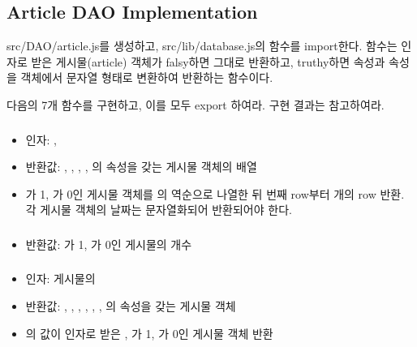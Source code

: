 \subsection*{Article DAO Implementation}

src/DAO/article.js를 생성하고, src/lib/database.js의  함수를 import한다.  함수는 인자로 받은 게시물(article) 객체가 falsy하면 그대로 반환하고, truthy하면  속성과  속성을  객체에서 문자열 형태로 변환하여 반환하는 함수이다.

다음의 7개 함수를 구현하고, 이를 모두 export 하여라. 구현 결과는 \를 참고하여라.

\subsubsection*{}
\begin{itemize}
    \item 인자: , 
    \item 반환값: , , , , 의  속성을 갖는 게시물 객체의 배열
    \item {}가 1, 가 0인 게시물 객체를 의 역순으로 나열한 뒤 번째 row부터 개의 row 반환. 각 게시물 객체의 날짜는 문자열화되어 반환되어야 한다.
\end{itemize}

\subsubsection*{}
\begin{itemize}
    \item 반환값: 가 1, 가 0인 게시물의 개수
\end{itemize}

\subsubsection*{}
\begin{itemize}
    \item 인자: 게시물의 
    \item 반환값: , , , , , , 의  속성을 갖는 게시물 객체
    \item {}의 값이 인자로 받은 , 가 1, 가 0인 게시물 객체 반환
\end{itemize}

